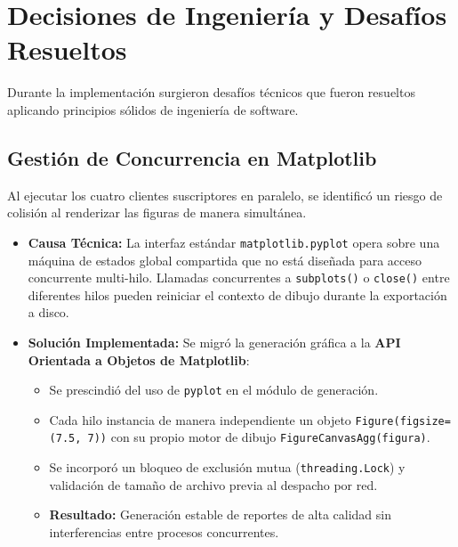 \documentclass[12pt,letterpaper]{article}
\begin{document}
\section{Decisiones de Ingeniería y Desafíos Resueltos}

Durante la implementación surgieron desafíos técnicos que fueron resueltos aplicando principios sólidos de ingeniería de software.

\subsection{Gestión de Concurrencia en Matplotlib}
Al ejecutar los cuatro clientes suscriptores en paralelo, se identificó un riesgo de colisión al renderizar las figuras de manera simultánea.
\begin{itemize}
    \item \textbf{Causa Técnica:} La interfaz estándar \texttt{matplotlib.pyplot} opera sobre una máquina de estados global compartida que no está diseñada para acceso concurrente multi-hilo. Llamadas concurrentes a \texttt{subplots()} o \texttt{close()} entre diferentes hilos pueden reiniciar el contexto de dibujo durante la exportación a disco.
    \item \textbf{Solución Implementada:} Se migró la generación gráfica a la \textbf{API Orientada a Objetos de Matplotlib}:
    \begin{itemize}
        \item Se prescindió del uso de \texttt{pyplot} en el módulo de generación.
        \item Cada hilo instancia de manera independiente un objeto \texttt{Figure(figsize=(7.5, 7))} con su propio motor de dibujo \texttt{FigureCanvasAgg(figura)}.
        \item Se incorporó un bloqueo de exclusión mutua (\texttt{threading.Lock}) y validación de tamaño de archivo previa al despacho por red.
        \item \textbf{Resultado:} Generación estable de reportes de alta calidad sin interferencias entre procesos concurrentes.
    \end{itemize}
\end{itemize}
\end{document}
